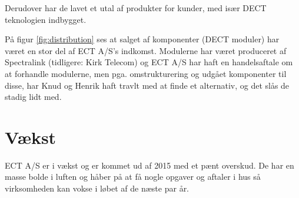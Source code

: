 Derudover har de lavet et utal af produkter for kunder, med især DECT teknologien indbygget.


På figur \ref{fig:distribution} ses at salget af komponenter (DECT moduler) har været en stor del af ECT A/S's indkomst. Modulerne har været produceret af Spectralink (tidligere: Kirk Telecom) og ECT A/S har haft en handelsaftale om at forhandle modulerne, men pga. omstrukturering og udgået komponenter til disse, har Knud og Henrik haft travlt med at finde et alternativ, og det slås de stadig lidt med.

\newpage
\section{Vækst}

ECT A/S er i vækst og er kommet ud af 2015 med et pænt overskud. De har en masse bolde i luften og håber på at få nogle opgaver og aftaler i hus så virksomheden kan vokse i løbet af de næste par år. 

